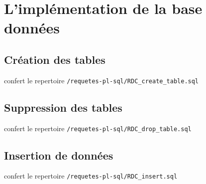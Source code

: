 \chapter{L'implémentation de la base données}

\section{Création des tables}
confert le repertoire \texttt{/requetes-pl-sql/RDC\_create\_table.sql}

\section{Suppression des tables}
confert le repertoire \texttt{/requetes-pl-sql/RDC\_drop\_table.sql}

\section{Insertion de données}
confert le repertoire \texttt{/requetes-pl-sql/RDC\_insert.sql}
